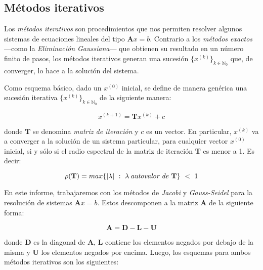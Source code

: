 
\vspace{1em}
\subsection{Métodos iterativos}
Los \textit{métodos iterativos} son procedimientos que nos permiten resolver algunos sistemas de ecuaciones lineales del tipo $\mathbf{A}x = b$. Contrario a los \textit{métodos exactos} ---como la \textit{Eliminación Gaussiana}--- que obtienen su resultado en un número finito de pasos, los métodos iterativos generan una sucesión $\{ x^{(k)} \}_{k \in \mathbb{N}_0}$ que, de converger, lo hace a la solución del sistema.

\vspace{1em}
Como esquema básico, dado un $x^{(0)}$ inicial, se define de manera genérica una sucesión iterativa  $\{ x^{(k)} \}_{k \in \mathbb{N}_0}$ de la siguiente manera:

\begin{equation}\label{sucesion}
    x^{(k+1)} = \mathbf{T}x^{(k)} + c
\end{equation}

\vspace{1em}
\noindent donde $\mathbf{T}$ se denomina \textit{matriz de iteración} y $c$ es un vector. En particular, $x^{(k)}$ va a converger a la solución de un sistema particular, para cualquier vector $x^{(0)}$ inicial, si y sólo si el radio espectral de la matriz de iteración \textbf{T} es menor a 1. Es decir:

\begin{equation}\label{espectral}
    \rho(\mathbf{T}) = max\{|\lambda|\ :\ \lambda \: \text{\textit{autovalor de} \textbf{T}}\}\ <\ 1
\end{equation}

\vspace{3em}
En este informe, trabajaremos con los métodos de \textit{Jacobi} y \textit{Gauss-Seidel} para la resolución de sistemas $\mathbf{A}x = b$. Estos descomponen a la matriz \textbf{A} de la siguiente forma: 

\begin{equation}
    \mathbf{A} = \mathbf{D} - \mathbf{L} - \mathbf{U}
\end{equation}

\vspace{1em}
\noindent donde $\mathbf{D}$ es la diagonal de $\mathbf{A}$, $\mathbf{L}$ contiene los elementos negados por debajo de la misma y $\mathbf{U}$ los elementos negados por encima. Luego, los esquemas para ambos métodos iterativos son los siguientes:

